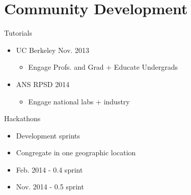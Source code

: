 \documentclass[xcolor=x11names,compress]{beamer}
\renewcommand{\(}{\begin{columns}}
\renewcommand{\)}{\end{columns}}
\newcommand{\<}[1]{\begin{column}{#1}}
\renewcommand{\>}{\end{column}}
\begin{document}
\section{Community Development}

\begin{frame}{Tutorials}
    \begin{itemize}
        \item UC Berkeley Nov. 2013
        \begin{itemize}
            \item Engage Profs. and Grad + Educate Undergrads
        \end{itemize}
        \item ANS RPSD 2014
        \begin{itemize}
            \item Engage national labs + industry
        \end{itemize}
    \end{itemize}
\end{frame}

\begin{frame}{Hackathons}
    \begin{itemize}
        \item Development sprints
        \item Congregate in one geographic location
        \item Feb. 2014 - 0.4 sprint 
        \item Nov. 2014 - 0.5 sprint
    \end{itemize}
\end{frame}

\end{document}
